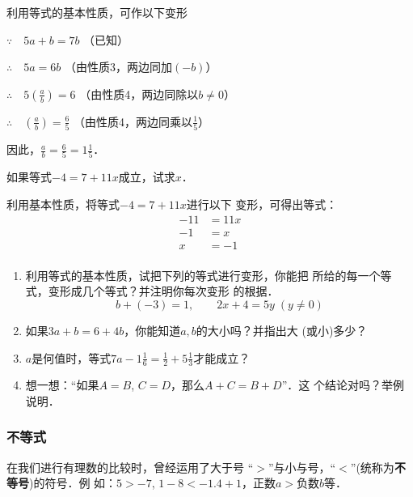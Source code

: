\begin{solution}
	利用等式的基本性质，可作以下变形
	
	$\because\quad 5a+b=7b$ （已知）
	
	$\therefore\quad 5a=6b$ （由性质3，两边同加$(-b)$）
	
	$\therefore\quad 5\left(\frac{a}{b}\right)=6$ （由性质4，两边同除以$b\ne 0$）
	
	$\therefore\quad \left(\frac{a}{b}\right)=\frac{6}{5}$ （由性质4，两边同乘以$\frac{1}{5}$）
	
	因此，$\frac{a}{b}=\frac{6}{5}=1\frac{1}{5}$．
\end{solution}

\begin{example}
	如果等式$-4=7+11x$成立，试求$x$．
\end{example}

\begin{solution}
	利用基本性质，将等式$-4=7+11x$进行以下
	变形，可得出等式：
	\begin{align*}
	-11&=11x  \tag{两边同减去7}\\
	-1&=x  \tag{两边同除以11}\\
	x&=-1  \tag{两边对调位置}\\
	\end{align*}
\end{solution}

\begin{ex}
	\begin{enumerate}
		\item 利用等式的基本性质，试把下列的等式进行变形，你能把
		所给的每一个等式，变形成几个等式？并注明你每次变形
		的根据．
		\[b+(-3)=1,\qquad 2x+4=5y\; (y\ne 0) \]
		\item 如果$3a+b=6+4b$，你能知道$a,b$的大小吗？并指出大
		(或小)多少？
		\item $a$是何值时，等式$7a-1\frac{1}{6}=\frac{1}{2}+5\frac{1}{3}$才能成立？
		
		\item 想一想：“如果$A=B$, $C=D$，那么$A+C=B+D$”．这
		个结论对吗？举例说明．
	\end{enumerate}   
\end{ex}

\subsubsection{不等式}
在我们进行有理数的比较时，曾经运用了大于号
“$>$”与小与号，“$<$”(统称为\textbf{不等号})的符号．例
如：$5>-7$,  $1-8<-1.4+1$，正数$a>$负数$b$等．

